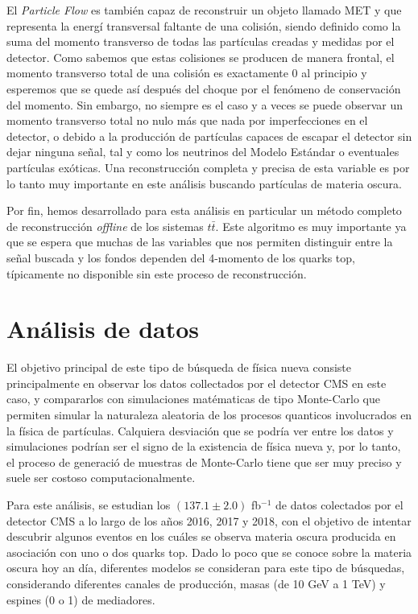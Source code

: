 \documentclass[a4paper, 10pt, openright]{report}
\begin{document}
\begin{appendices}
El \textit{Particle Flow} es tambi\'{e}n capaz de reconstruir un objeto llamado \ac{MET} y que representa la energ\'{i} transversal faltante de una colisi\'{o}n, siendo definido como la suma del momento transverso de todas las part\'{i}culas creadas y medidas por el detector. Como sabemos que estas colisiones se producen de manera frontal, el momento transverso total de una colisi\'{o}n es exactamente 0 al principio y esperemos que se quede as\'{i} despu\'{e}s del choque por el fen\'{o}meno de conservaci\'{o}n del momento. Sin embargo, no siempre es el caso y a veces se puede observar un momento transverso total no nulo m\'{a}s que nada por imperfecciones en el detector, o debido a la producci\'{o}n de part\'{i}culas capaces de escapar el detector sin dejar ninguna se\~{n}al, tal y como los neutrinos del Modelo Est\'{a}ndar o eventuales part\'{i}culas ex\'{o}ticas. Una reconstrucci\'{o}n completa y precisa de esta variable es por lo tanto muy importante en este an\'{a}lisis buscando part\'{i}culas de materia oscura.

Por fin, hemos desarrollado para esta an\'{a}lisis en particular un m\'{e}todo completo de reconstrucci\'{o}n \textit{offline} de los sistemas $t \bar t$. Este algoritmo es muy importante ya que se espera que muchas de las variables que nos permiten distinguir entre la se\~{n}al buscada y los fondos dependen del 4-momento de los quarks top, t\'{i}picamente no disponible sin este proceso de reconstrucci\'{o}n.

\section{An\'{a}lisis de datos}

El objetivo principal de este tipo de b\'{u}squeda de f\'{i}sica nueva consiste principalmente en observar los datos collectados por el detector \ac{CMS} en este caso, y compararlos con simulaciones mat\'{e}maticas de tipo Monte-Carlo que permiten simular la naturaleza aleatoria de los procesos quanticos involucrados en la f\'{i}sica de part\'{i}culas. Calquiera desviaci\'{o}n que se podr\'{i}a ver entre los datos y simulaciones podr\'{i}an ser el signo de la existencia de f\'{i}sica nueva y, por lo tanto, el proceso de generaci\'{o} de muestras de Monte-Carlo tiene que ser muy preciso y suele ser costoso computacionalmente.  

Para este an\'{a}lisis, se estudian los $(137.1 \pm 2.0)$ fb$^{-1}$ de datos colectados por el detector \ac{CMS} a lo largo de los a\~{n}os 2016, 2017 y 2018, con el objetivo de intentar descubrir algunos eventos en los cu\'{a}les se observa materia oscura producida en asociaci\'{o}n con uno o dos quarks top. Dado lo poco que se conoce sobre la materia oscura hoy an d\'{i}a, diferentes modelos se consideran para este tipo de b\'{u}squedas, considerando diferentes canales de producci\'{o}n, masas (de 10 GeV a 1 TeV) y espines (0 o 1) de mediadores.%


\end{appendices}
\end{document}
